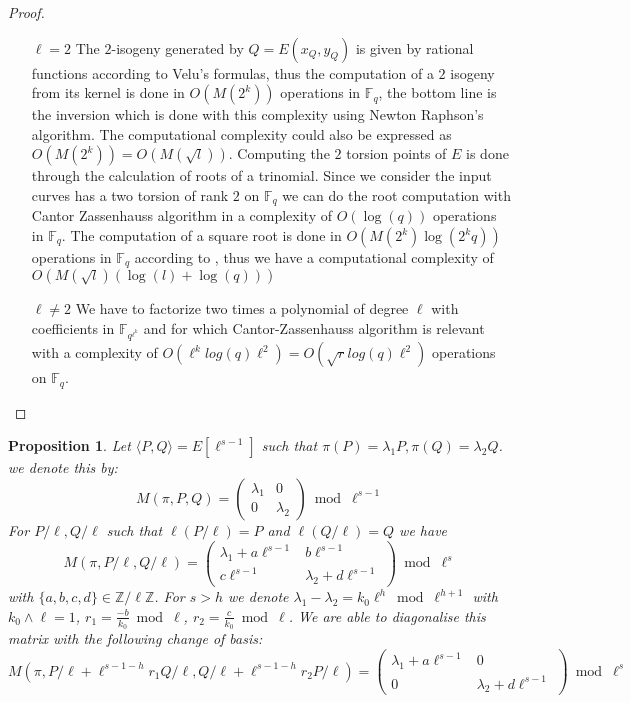 \documentclass{article}
\theoremstyle{plain}
\newtheorem{prop}[thm]{Proposition}
\theoremstyle{definition}
\theoremstyle{remark}
\begin{document}
\begin{proof}
\begin{itemize}
\item[$\ell = 2$ ]
The $2$-isogeny generated by $Q=E(x_Q,y_Q)$ is given by rational functions according to Velu's formulas, thus the computation of a $2$ isogeny from its kernel is done in $O(M(2^k))$ operations in $\mathbb{F}_q$, the bottom line is the inversion which is done with this complexity using Newton Raphson's algorithm. The computational complexity could also be expressed as $O(M(2^k))=O(M(\sqrt{l}))$.
\newline
Computing the $2$ torsion points of $E$ is done through the calculation of roots of a trinomial.
Since we consider the input curves has a two torsion of rank $2$ on $\mathbb{F}_q$ we can do the root computation with Cantor Zassenhauss algorithm in a complexity of $O( \log(q))$ operations in $\mathbb{F}_q$. 
The computation of a square root is done in $O(M(2^k)\log(2^kq))$ operations in $\mathbb{F}_q$ according to \cite{DBLP:journals/dcc/DoliskaniS15}, thus we have a computational complexity of $O(M(\sqrt{l})(\log(l)+\log(q)))$
\item[$\ell \neq 2$] We have to factorize two times a polynomial of degree $\ell$ with coefficients in $\mathbb{F}_{q^{\ell^k}}$ and for which Cantor-Zassenhauss algorithm is relevant with a complexity of $O(\ell^klog(q)\ell^2)=O(\sqrt{r}log(q)\ell^2)$ operations on $\mathbb{F}_q$.
\end{itemize}
\end{proof}

\begin{prop}\label{propdiago2}
Let $ \langle P,Q \rangle = E[\ell^{s-1}]$ such that $\pi(P)=\lambda_1 P, \pi(Q)=\lambda_2 Q $. we denote this by:
\[
M(\pi,P,Q)=\left( \begin{array}{cc}
\lambda_1 & 0\\
0 & \lambda_2 
\end{array} \right) \bmod \ell^{s-1}
\]
For $P/\ell,Q/\ell$ such that $\ell(P/\ell)=P$ and $\ell(Q/\ell)=Q$ we have \[M(\pi,P/\ell,Q/\ell)=\left( \begin{array}{cc}
\lambda_1 + a\ell^{s-1} & b\ell^{s-1}\\
c\ell^{s-1} & \lambda_2 + d\ell^{s-1}
\end{array} \right) \bmod \ell^{s} \] with $\{a,b,c,d\} \in \mathbb{Z}/ \ell \mathbb{Z}$. For $s>h$ we denote $\lambda_1-\lambda_2=k_0 \ell^h \bmod \ell^{h+1}$ with $k_0 \wedge \ell =1$, $r_1=\frac{-b}{k_0} \bmod \ell$, $r_2=\frac{c}{k_0} \bmod \ell$. We are able to diagonalise this matrix with the following change of basis:
 \[M(\pi,P/\ell+\ell^{s-1-h}r_1Q/\ell,Q/\ell+\ell^{s-1-h}r_2P/\ell)=\left( \begin{array}{cc}
\lambda_1 + a\ell^{s-1} & 0\\
0 & \lambda_2 + d\ell^{s-1}
\end{array} \right) \bmod \ell^{s} \]
\end{prop}
\end{document}
